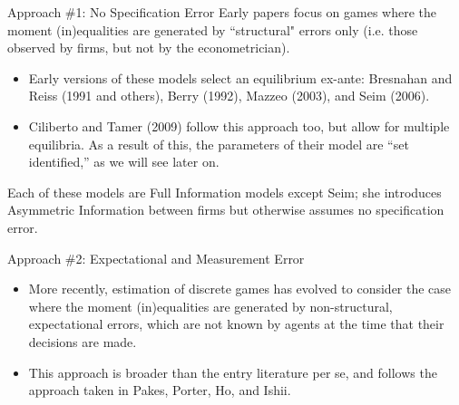 \begin{frame}{Approach \#1: No Specification Error}
\vspace{2mm}
Early papers focus on games where the moment (in)equalities are generated by ``structural" errors only (i.e. those observed by firms, but not by the econometrician).  
\begin{itemize}
\item Early versions of these models select an equilibrium ex-ante: Bresnahan and Reiss (1991 and others), Berry (1992), Mazzeo (2003), and Seim (2006).  
\item Ciliberto and Tamer (2009) follow this approach too, but allow for multiple equilibria.  As a result of this, the parameters of their model are ``set identified,'' as we will see later on.
\end{itemize}
Each of these models are Full Information models except Seim; she introduces Asymmetric Information between firms but otherwise assumes no specification error.\\
\end{frame}

\begin{frame}{Approach \#2: Expectational and Measurement Error}
\vspace{2mm}
\begin{itemize}
\item More recently, estimation of discrete games has evolved to consider the case where the moment (in)equalities are generated by non-structural, expectational errors, which are not known by agents at the time that their decisions are made.
\item This approach is broader than the entry literature per se, and follows the approach taken in Pakes, Porter, Ho, and Ishii. 
\end{itemize}
\end{frame}


